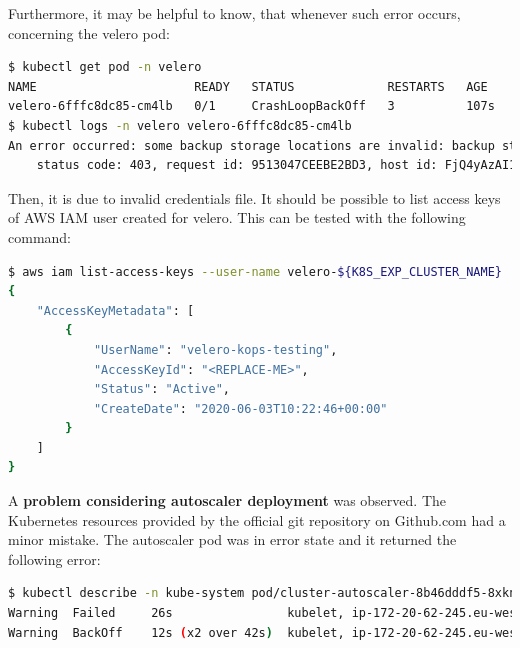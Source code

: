 Furthermore, it may be helpful to know, that whenever such error occurs, concerning the velero pod:
\begin{lstlisting}[basicstyle=\tiny,caption={Debuggin Velero},captionpos=b,language=Bash,xleftmargin=1cm]
$ kubectl get pod -n velero
NAME                      READY   STATUS             RESTARTS   AGE
velero-6fffc8dc85-cm4lb   0/1     CrashLoopBackOff   3          107s
$ kubectl logs -n velero velero-6fffc8dc85-cm4lb
An error occurred: some backup storage locations are invalid: backup store for location "aws" is invalid: rpc error: code = Unknown desc = AccessDenied: Access Denied
	status code: 403, request id: 9513047CEEBE2BD3, host id: FjQ4yAzAI1zhyFXRIS67Ww3rSqt2a1fqoeLzYEAdKsRLqx3AmpEzWWloJZXZPx9rKJs9qCH1yHY=
\end{lstlisting}
Then, it is due to invalid credentials file. It should be possible to list access keys of AWS IAM user created for velero. This can be tested with the following command:
\begin{lstlisting}[basicstyle=\tiny,caption={Listing AWS IAM keys},captionpos=b,language=Bash,xleftmargin=1cm]
$ aws iam list-access-keys --user-name velero-${K8S_EXP_CLUSTER_NAME}
{
    "AccessKeyMetadata": [
        {
            "UserName": "velero-kops-testing",
            "AccessKeyId": "<REPLACE-ME>",
            "Status": "Active",
            "CreateDate": "2020-06-03T10:22:46+00:00"
        }
    ]
}
\end{lstlisting}

A \textbf{problem considering autoscaler deployment} was observed. The Kubernetes resources provided by the official git repository on Github.com had a minor mistake. The autoscaler pod was in error state and it returned the following error:
\begin{lstlisting}[basicstyle=\tiny,caption={Debugging autoscaler},captionpos=b,language=Bash,xleftmargin=1cm]
$ kubectl describe -n kube-system pod/cluster-autoscaler-8b46dddf5-8xkns
Warning  Failed     26s                kubelet, ip-172-20-62-245.eu-west-1.compute.internal  Error: failed to start container "cluster-autoscaler": Error response from daemon: OCI runtime create failed: container_linux.go:346: starting container process caused "process_linux.go:449: container init caused \"rootfs_linux.go:58: mounting \\\"/etc/ssl/certs/ca-bundle.crt\\\" to rootfs \\\"/var/lib/docker/overlay2/0f99e6ea6c9a9f8dedf87b977b72ecff7b56e0e6e439fcd8f9275bda3dbcabe6/merged\\\" at \\\"/var/lib/docker/overlay2/0f99e6ea6c9a9f8dedf87b977b72ecff7b56e0e6e439fcd8f9275bda3dbcabe6/merged/etc/ssl/certs/ca-certificates.crt\\\" caused \\\"not a directory\\\"\"": unknown: Are you trying to mount a directory onto a file (or vice-versa)? Check if the specified host path exists and is the expected type
Warning  BackOff    12s (x2 over 42s)  kubelet, ip-172-20-62-245.eu-west-1.compute.internal  Back-off restarting failed container
\end{lstlisting}

